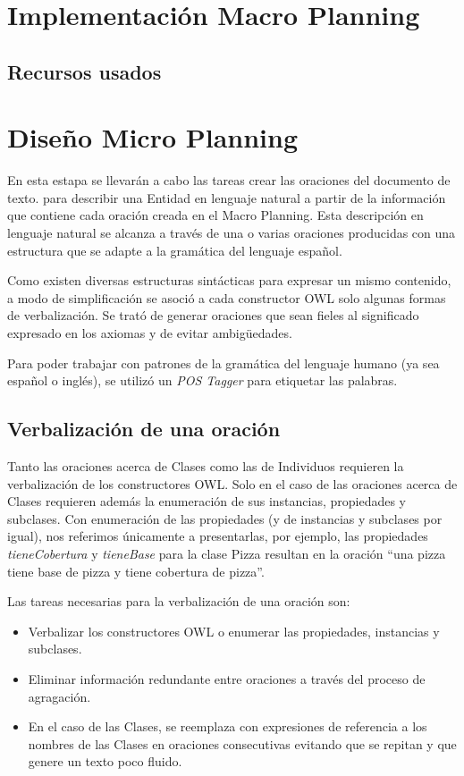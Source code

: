 \section{Implementación Macro Planning}
\subsection{Recursos usados}

\section{Diseño Micro Planning}
En esta estapa se llevarán a cabo las tareas crear las oraciones del documento de texto.
para describir una Entidad en lenguaje natural a partir de la información que contiene cada oración creada en el Macro Planning. Esta descripción en lenguaje natural se alcanza a través de una o varias oraciones producidas con una estructura que se adapte a la gramática del lenguaje español.

Como existen diversas estructuras sintácticas para expresar un mismo contenido, a modo de simplificación se asoció a cada constructor OWL solo algunas formas de verbalización. Se trató de generar oraciones que sean fieles al significado expresado en los axiomas y de evitar ambigüedades.

Para poder trabajar con patrones de la gramática del lenguaje humano (ya sea español o inglés), se utilizó un \emph{POS Tagger} para etiquetar las palabras.

\subsection{Verbalización de una oración}
Tanto las oraciones acerca de Clases como las de Individuos requieren la verbalización de los constructores OWL. Solo en el caso de las oraciones acerca de Clases requieren además la enumeración de sus instancias, propiedades y subclases. Con enumeración de las propiedades (y de instancias y subclases por igual), nos referimos únicamente a presentarlas, por ejemplo, las propiedades \emph{tieneCobertura} y \emph{tieneBase} para la clase Pizza resultan en la oración ``una pizza tiene base de pizza y tiene cobertura de pizza''.

Las tareas necesarias para la verbalización de una oración son:
\begin{itemize}
    \item Verbalizar los constructores OWL o enumerar las propiedades, instancias y subclases.
    \item Eliminar información redundante entre oraciones a través del proceso de agragación.
    \item En el caso de las Clases, se reemplaza con expresiones de referencia a los nombres de las Clases en oraciones consecutivas evitando que se repitan y que genere un texto poco fluido.
\end{itemize}

